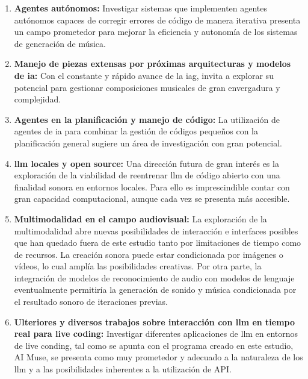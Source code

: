 \begin{enumerate}
\item \textbf{Agentes autónomos:} Investigar sistemas que implementen agentes autónomos capaces de corregir errores de código de manera iterativa presenta un campo prometedor para mejorar la eficiencia y autonomía de los sistemas de generación de música.

\item \textbf{Manejo de piezas extensas por próximas arquitecturas y modelos de \gls{ia}:} Con el constante y rápido avance de la \gls{iag},  invita a explorar su potencial para gestionar composiciones musicales de gran envergadura y complejidad.

\item \textbf{Agentes en la planificación y manejo de código:} La utilización de agentes de \gls{ia} para combinar la gestión de códigos pequeños con la planificación general sugiere un área de investigación con gran potencial.

\item \textbf{\gls{llm} locales y open source:} Una dirección futura de gran interés es la exploración de la viabilidad de reentrenar \gls{llm} de código abierto con una finalidad sonora en entornos locales. Para ello es imprescindible contar con gran capacidad computacional, aunque cada vez se presenta más accesible.

\item \textbf{Multimodalidad en el campo audiovisual:} La exploración de la multimodalidad abre nuevas posibilidades de interacción e interfaces posibles que han quedado fuera de este estudio tanto por limitaciones de tiempo como de recursos. La creación sonora puede estar condicionada por imágenes o vídeos, lo cual amplía las posibilidades creativas. Por otra parte, la integración de modelos de reconocimiento de audio con modelos de lenguaje eventualmente permitiría la generación de sonido y música condicionada por el resultado sonoro de iteraciones previas.

\item \textbf{Ulteriores y diversos trabajos sobre interacción con \gls{llm} en tiempo real para live coding:} Investigar diferentes aplicaciones de \gls{llm} en entornos de live conding, tal como se apunta con el programa creado en este estudio, AI Muse, se presenta como muy prometedor y adecuado a la naturaleza de los \gls{llm} y a las posibilidades inherentes a la utilización de API.

\end{enumerate}
